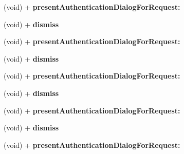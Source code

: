 \begin{DoxyCompactItemize}
\item 
\hypertarget{interface_a_s_i_authentication_dialog_a07eb1b70ffa5f5279a32a23f3e1de378}{
(void) + {\bfseries present\-Authentication\-Dialog\-For\-Request\-:}}
\label{interface_a_s_i_authentication_dialog_a07eb1b70ffa5f5279a32a23f3e1de378}

\item 
\hypertarget{interface_a_s_i_authentication_dialog_a56735bd2a28feda5aa645dbd7bf7b180}{
(void) + {\bfseries dismiss}}
\label{interface_a_s_i_authentication_dialog_a56735bd2a28feda5aa645dbd7bf7b180}

\item 
\hypertarget{interface_a_s_i_authentication_dialog_a07eb1b70ffa5f5279a32a23f3e1de378}{
(void) + {\bfseries present\-Authentication\-Dialog\-For\-Request\-:}}
\label{interface_a_s_i_authentication_dialog_a07eb1b70ffa5f5279a32a23f3e1de378}

\item 
\hypertarget{interface_a_s_i_authentication_dialog_a56735bd2a28feda5aa645dbd7bf7b180}{
(void) + {\bfseries dismiss}}
\label{interface_a_s_i_authentication_dialog_a56735bd2a28feda5aa645dbd7bf7b180}

\item 
\hypertarget{interface_a_s_i_authentication_dialog_a07eb1b70ffa5f5279a32a23f3e1de378}{
(void) + {\bfseries present\-Authentication\-Dialog\-For\-Request\-:}}
\label{interface_a_s_i_authentication_dialog_a07eb1b70ffa5f5279a32a23f3e1de378}

\item 
\hypertarget{interface_a_s_i_authentication_dialog_a56735bd2a28feda5aa645dbd7bf7b180}{
(void) + {\bfseries dismiss}}
\label{interface_a_s_i_authentication_dialog_a56735bd2a28feda5aa645dbd7bf7b180}

\item 
\hypertarget{interface_a_s_i_authentication_dialog_a07eb1b70ffa5f5279a32a23f3e1de378}{
(void) + {\bfseries present\-Authentication\-Dialog\-For\-Request\-:}}
\label{interface_a_s_i_authentication_dialog_a07eb1b70ffa5f5279a32a23f3e1de378}

\item 
\hypertarget{interface_a_s_i_authentication_dialog_a56735bd2a28feda5aa645dbd7bf7b180}{
(void) + {\bfseries dismiss}}
\label{interface_a_s_i_authentication_dialog_a56735bd2a28feda5aa645dbd7bf7b180}

\item 
\hypertarget{interface_a_s_i_authentication_dialog_a07eb1b70ffa5f5279a32a23f3e1de378}{
(void) + {\bfseries present\-Authentication\-Dialog\-For\-Request\-:}}
\label{interface_a_s_i_authentication_dialog_a07eb1b70ffa5f5279a32a23f3e1de378}


\end{DoxyCompactItemize}
